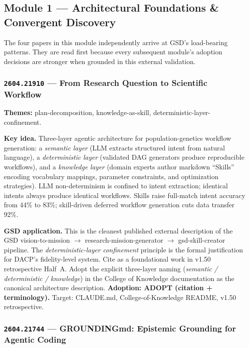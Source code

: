 \documentclass[11pt,letterpaper]{article}
\newcommand{\arxivid}[1]{\texttt{\textcolor{accent}{#1}}}
\newcommand{\paperhead}[2]{\noindent\textbf{\sffamily\textcolor{secondary}{#1}} \textemdash{} #2}
\begin{document}
\subsection{Module 1 --- Architectural Foundations \& Convergent Discovery}

The four papers in this module independently arrive at GSD's load-bearing patterns. They are read first because every subsequent module's adoption decisions are stronger when grounded in this external validation.

\subsubsection{\arxivid{2604.21910} --- From Research Question to Scientific Workflow}

\paperhead{Themes:}{plan-decomposition, knowledge-as-skill, deterministic-layer-confinement.}

\textbf{Key idea.} Three-layer agentic architecture for population-genetics workflow generation: a \textit{semantic layer} (LLM extracts structured intent from natural language), a \textit{deterministic layer} (validated DAG generators produce reproducible workflows), and a \textit{knowledge layer} (domain experts author markdown ``Skills'' encoding vocabulary mappings, parameter constraints, and optimization strategies). LLM non-determinism is confined to intent extraction; identical intents always produce identical workflows. Skills raise full-match intent accuracy from 44\% to 83\%; skill-driven deferred workflow generation cuts data transfer 92\%.

\textbf{GSD application.} This is the cleanest published external description of the GSD vision-to-mission $\rightarrow$ research-mission-generator $\rightarrow$ gsd-skill-creator pipeline. The \textit{deterministic-layer confinement} principle is the formal justification for DACP's fidelity-level system. Cite as a foundational work in v1.50 retrospective Half~A. Adopt the explicit three-layer naming (\textit{semantic / deterministic / knowledge}) in the College of Knowledge documentation as the canonical architecture description. \textbf{Adoption: ADOPT (citation + terminology).} Target: CLAUDE.md, College-of-Knowledge README, v1.50 retrospective.

\subsubsection{\arxivid{2604.21744} --- GROUNDINGmd: Epistemic Grounding for Agentic Coding}
\end{document}
